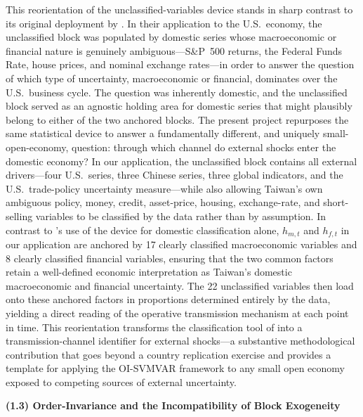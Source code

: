 This reorientation of the unclassified-variables device stands in sharp contrast to its original deployment by \citet{davidson2025investigating}. In their application to the U.S.\ economy, the unclassified block was populated by domestic series whose macroeconomic or financial nature is genuinely ambiguous---S\&P~500 returns, the Federal Funds Rate, house prices, and nominal exchange rates---in order to answer the question of which type of uncertainty, macroeconomic or financial, dominates over the U.S.\ business cycle. The question was inherently domestic, and the unclassified block served as an agnostic holding area for domestic series that might plausibly belong to either of the two anchored blocks. The present project repurposes the same statistical device to answer a fundamentally different, and uniquely small-open-economy, question: through which channel do external shocks enter the domestic economy? In our application, the unclassified block contains all external drivers---four U.S.\ series, three Chinese series, three global indicators, and the U.S.\ trade-policy uncertainty measure---while also allowing Taiwan's own ambiguous policy, money, credit, asset-price, housing, exchange-rate, and short-selling variables to be classified by the data rather than by assumption. In contrast to \citet{davidson2025investigating}'s use of the device for domestic classification alone, $h_{m,t}$ and $h_{f,t}$ in our application are anchored by 17 clearly classified macroeconomic variables and 8 clearly classified financial variables, ensuring that the two common factors retain a well-defined economic interpretation as Taiwan's domestic macroeconomic and financial uncertainty. The 22 unclassified variables then load onto these anchored factors in proportions determined entirely by the data, yielding a direct reading of the operative transmission mechanism at each point in time. This reorientation transforms the classification tool of \citet{davidson2025investigating} into a transmission-channel identifier for external shocks---a substantive methodological contribution that goes beyond a country replication exercise and provides a template for applying the OI-SVMVAR framework to any small open economy exposed to competing sources of external uncertainty.

\bigskip

\noindent\textbf{(1.3) Order-Invariance and the Incompatibility of Block Exogeneity}

\medskip

